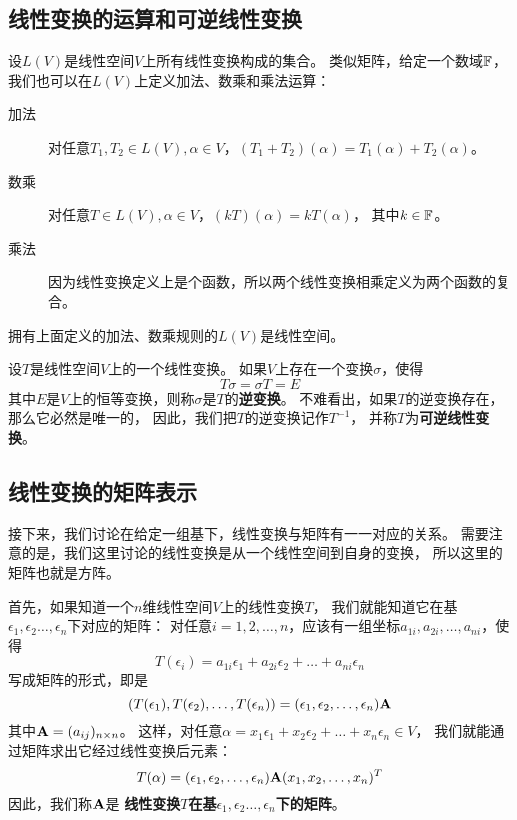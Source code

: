 \subsection{线性变换的运算和可逆线性变换}
设$L(V)$是线性空间$V$上所有线性变换构成的集合。
类似矩阵，给定一个数域$\mathbb{F}$，
我们也可以在$L(V)$上定义加法、数乘和乘法运算：
\begin{description}
  \item[加法]
  对任意$T_1,T_2\in L(V),\alpha\in V$，$(T_1+T_2)(\alpha)=T_1(\alpha)+T_2(\alpha)$。
  \item[数乘]
  对任意$T\in L(V),\alpha\in V$，$(kT)(\alpha)=kT(\alpha)$，
  其中$k\in\mathbb{F}$。
  \item[乘法]
  因为线性变换定义上是个函数，所以两个线性变换相乘定义为两个函数的复合。
\end{description}

\begin{theorem}
  拥有上面定义的加法、数乘规则的$L(V)$是线性空间。
\end{theorem}

\begin{definition}[可逆线性变换]
  设$T$是线性空间$V$上的一个线性变换。
  如果$V$上存在一个变换$\sigma$，使得
  \[ T\sigma = \sigma T = E \]
  其中$E$是$V$上的恒等变换，则称$\sigma$是$T$的\textbf{逆变换}。
  不难看出，如果$T$的逆变换存在，那么它必然是唯一的，
  因此，我们把$T$的逆变换记作$T^{-1}$，
  并称$T$为\textbf{可逆线性变换}。
\end{definition}

\subsection{线性变换的矩阵表示}
接下来，我们讨论在给定一组基下，线性变换与矩阵有一一对应的关系。
需要注意的是，我们这里讨论的线性变换是从一个线性空间到自身的变换，
所以这里的矩阵也就是方阵。

首先，如果知道一个$n$维线性空间$V$上的线性变换$T$，
我们就能知道它在基$\epsilon_1,\epsilon_2\dots,\epsilon_n$下对应的矩阵：
对任意$i=1,2,\dots,n$，应该有一组坐标$a_{1i},a_{2i},\dots,a_{ni}$，使得
\begin{displaymath}
  T(\epsilon_i) = a_{1i}\epsilon_1+a_{2i}\epsilon_2+\dots+a_{ni}\epsilon_n
\end{displaymath}
写成矩阵的形式，即是
\begin{displaymath}
  (T(\epsilon_1), T(\epsilon_2),\dots,T(\epsilon_n)) =
    (\epsilon_1,\epsilon_2,\dots,\epsilon_n)\mathbf{A}
\end{displaymath}
其中$\mathbf{A}=(a_{ij})_{n\times n}$。
这样，对任意$\alpha=x_1\epsilon_1+x_2\epsilon_2+\dots+x_n\epsilon_n\in V$，
我们就能通过矩阵求出它经过线性变换后元素：
\begin{equation} \label{eq-coord-after-linear-trans}
  T(\alpha) = (\epsilon_1,\epsilon_2,\dots,\epsilon_n)\mathbf{A}
    (x_1,x_2,\dots,x_n)^T
\end{equation}
因此，我们称$\mathbf{A}$是
\textbf{线性变换$T$在基$\epsilon_1,\epsilon_2\dots,\epsilon_n$下的矩阵}。

